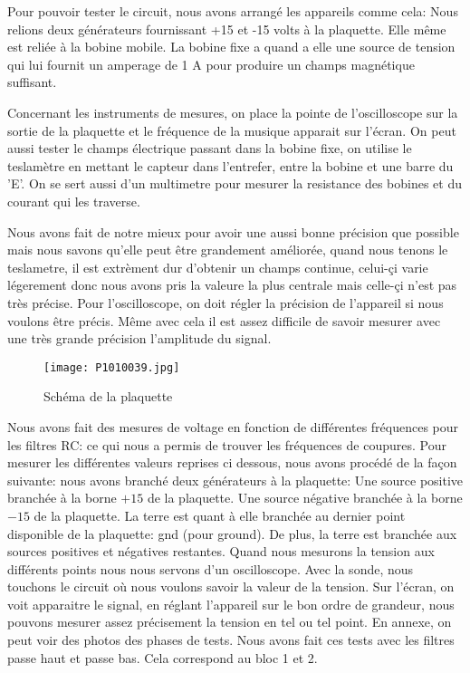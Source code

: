 

Pour pouvoir tester le circuit, nous avons arrangé les appareils comme cela: Nous relions deux générateurs fournissant +15 et
-15 volts à la plaquette. Elle même est reliée à la bobine mobile. La bobine fixe a quand a elle une source de tension qui
lui fournit un amperage de 1 A pour produire un champs magnétique suffisant.


Concernant les instruments de mesures, on place la pointe de l'oscilloscope sur la sortie de la plaquette et le fréquence
de la musique apparait sur l'écran. On peut aussi tester le champs électrique passant dans la bobine fixe, on utilise le
teslamètre en mettant le capteur dans l'entrefer, entre la bobine et une barre du 'E'. On se sert aussi d'un multimetre
pour mesurer la resistance des bobines et du courant qui les traverse.


Nous avons fait de notre mieux pour avoir une aussi bonne précision que possible mais nous savons qu'elle peut être grandement
améliorée, quand nous tenons le teslametre, il est extrèment dur d'obtenir un champs continue, celui-çi varie légerement donc
nous avons pris la valeure la plus centrale mais celle-çi n'est pas très précise. Pour l'oscilloscope, on doit régler
la précision de l'appareil si nous voulons être précis. Même avec cela il est assez difficile de savoir mesurer avec une
très grande précision l'amplitude du signal.

\begin{figure}[ht!]
    \centering
    \texttt{[image: P1010039.jpg]}
    \caption{Schéma de la plaquette}
    \label{plaquette}
\end{figure}



Nous avons fait des mesures de voltage en fonction de différentes fréquences pour les filtres RC: ce qui nous a permis
de trouver les fréquences de coupures. Pour mesurer les différentes valeurs reprises ci dessous, nous avons procédé de la
façon suivante: nous avons branché deux générateurs à la plaquette: Une source positive branchée à la borne $+15$ de la plaquette.
Une source négative branchée à la borne $-15$ de la plaquette. La terre est quant à elle branchée au dernier point
disponible de la plaquette: gnd (pour ground). De plus, la terre est branchée aux sources positives et négatives
restantes. Quand nous mesurons la tension aux différents points nous nous servons d'un oscilloscope. Avec la sonde,
nous touchons le circuit où nous voulons savoir la valeur de la tension. Sur l'écran, on voit apparaitre le
signal, en réglant l'appareil sur le bon ordre de grandeur, nous pouvons mesurer assez précisement la tension en
tel ou tel point. En annexe, on peut voir des photos des phases de tests.
  Nous avons fait ces tests avec les filtres
passe haut et passe bas. Cela correspond au bloc 1 et 2.

